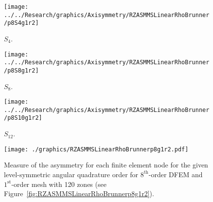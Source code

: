 \documentclass[12pt,letterpaper]{article}
\begin{document}
\begin{sidewaysfigure}[!htb]
\centering
\begin{subfigure}{0.33\textwidth}
\texttt{[image: ../../Research/graphics/Axisymmetry/RZASMMSLinearRhoBrunner/p8S4g1r2]}
\caption{$S_4$.}
\end{subfigure}%
\begin{subfigure}{0.33\textwidth}
\texttt{[image: ../../Research/graphics/Axisymmetry/RZASMMSLinearRhoBrunner/p8S8g1r2]}
\caption{$S_8$.}
\end{subfigure}%
\begin{subfigure}{0.33\textwidth}
\texttt{[image: ../../Research/graphics/Axisymmetry/RZASMMSLinearRhoBrunner/p8S10g1r2]}
\caption{$S_{12}$.}
\end{subfigure}
\caption{Relative asymmetry for $8^\text{st}$-order finite elements on a $1^\text{st}$-order mesh for given order of level-symmetric angular quadrature.}
\label{fig:RZASMMSLinearRhoBrunnerp8g1r2}
\end{sidewaysfigure}

\begin{figure}[!htb]
\centering
\texttt{[image: ./graphics/RZASMMSLinearRhoBrunnerp8g1r2.pdf]}
\caption{Measure of the asymmetry for each finite element node for the given level-symmetric angular quadrature order for $8^\text{th}$-order DFEM and $1^\text{st}$-order mesh with 120 zones (see Figure~\ref{fig:RZASMMSLinearRhoBrunnerp8g1r2}).}
\label{fig:RZASMMSLinearRhoBrunnerp8g1r2Nodes}
\end{figure}
\end{document}
